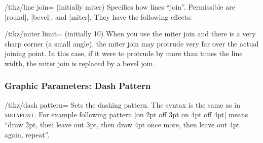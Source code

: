 \begin{key}{/tikz/line join= (initially miter)}
    Specifies how lines ``join''. Permissible  are |round|, |bevel|,
    and |miter|. They have the following effects:
\begin{codeexample}[]
\end{codeexample}

    \begin{key}{/tikz/miter limit= (initially 10)}
        When you use the miter join and there is a very sharp corner (a small
        angle), the miter join may protrude very far over the actual joining
        point. In this case, if it were to protrude by more than 
        times the line width, the miter join is replaced by a bevel join.
\begin{codeexample}[]
\end{codeexample}
    \end{key}
\end{key}


\subsubsection{Graphic Parameters: Dash Pattern}

\begin{key}{/tikz/dash pattern=}
    Sets the dashing pattern. The syntax is the same as in \textsc{metafont}.
    For example following pattern |on 2pt off 3pt on 4pt off 4pt| means ``draw
    2pt, then leave out 3pt, then draw 4pt once more, then leave out 4pt again,
    repeat''.
\begin{codeexample}[]
\begin{tikzpicture}[dash pattern=on 2pt off 3pt on 4pt off 4pt]
  \draw (0pt,0pt) -- (3.5cm,0pt);
\end{tikzpicture}
\end{codeexample}
\end{key}

